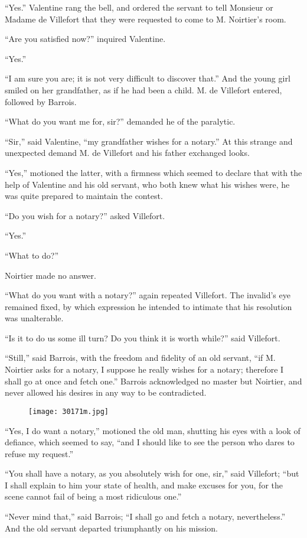 “Yes.” Valentine rang the bell, and ordered the servant to tell
Monsieur or Madame de Villefort that they were requested to come to M.
Noirtier’s room.

“Are you satisfied now?” inquired Valentine.

“Yes.”

“I am sure you are; it is not very difficult to discover that.” And the
young girl smiled on her grandfather, as if he had been a child. M. de
Villefort entered, followed by Barrois.

“What do you want me for, sir?” demanded he of the paralytic.

“Sir,” said Valentine, “my grandfather wishes for a notary.” At this
strange and unexpected demand M. de Villefort and his father exchanged
looks.

“Yes,” motioned the latter, with a firmness which seemed to declare
that with the help of Valentine and his old servant, who both knew what
his wishes were, he was quite prepared to maintain the contest.

“Do you wish for a notary?” asked Villefort.

“Yes.”

“What to do?”

Noirtier made no answer.

“What do you want with a notary?” again repeated Villefort. The
invalid’s eye remained fixed, by which expression he intended to
intimate that his resolution was unalterable.

“Is it to do us some ill turn? Do you think it is worth while?” said
Villefort.

“Still,” said Barrois, with the freedom and fidelity of an old servant,
“if M. Noirtier asks for a notary, I suppose he really wishes for a
notary; therefore I shall go at once and fetch one.” Barrois
acknowledged no master but Noirtier, and never allowed his desires in
any way to be contradicted.

\begin{figure}[ht]
\texttt{[image: 30171m.jpg]}
\end{figure}

“Yes, I do want a notary,” motioned the old man, shutting his eyes with
a look of defiance, which seemed to say, “and I should like to see the
person who dares to refuse my request.”

“You shall have a notary, as you absolutely wish for one, sir,” said
Villefort; “but I shall explain to him your state of health, and make
excuses for you, for the scene cannot fail of being a most ridiculous
one.”

“Never mind that,” said Barrois; “I shall go and fetch a notary,
nevertheless.” And the old servant departed triumphantly on his
mission.
